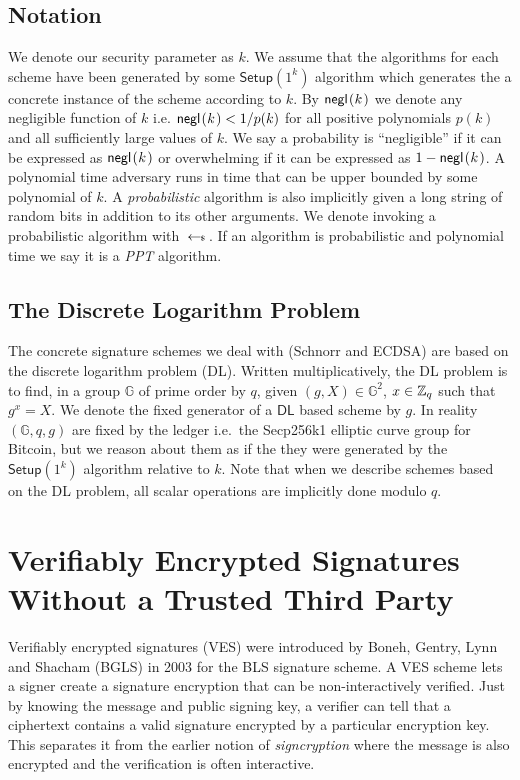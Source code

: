\documentclass[fullpage]{article}
\theoremstyle{definition}
\newcommand{\G}{\mathbb{G}}
\newcommand{\DLOG}{\textsf{DL}\xspace}
\begin{document}
\subsection{Notation}
We denote our security parameter as $k$. We assume that the algorithms for each scheme have been generated by some $\textsf{Setup}(1^k)$ algorithm which generates the a concrete instance of the scheme according to $k$. By $\negl[k]$ we denote any negligible function of $k$ i.e.  $\negl[k] < 1/p(k)$  for all positive polynomials $p(k)$ and all sufficiently large values of $k$. We say a probability is ``negligible'' if it can be expressed as $\negl[k]$ or overwhelming if it can be expressed as $1 - \negl[k]$.  A polynomial time adversary runs in time that can be upper bounded by some polynomial of $k$. A \emph{probabilistic} algorithm is also implicitly given a long string of random bits in addition to its other arguments. We denote invoking a probabilistic algorithm with $\hskip2.3pt{\gets\!\!\mbox{\tiny${\$}$\normalsize}}\,$. If an algorithm is probabilistic and polynomial time we say it is a \emph{PPT} algorithm.

\subsection{The Discrete Logarithm Problem}

The concrete signature schemes we deal with (Schnorr and ECDSA) are based on the discrete logarithm problem (\DLOG). Written multiplicatively, the \DLOG problem is to find, in a group $\G$ of prime order by $q$, given $(g,X) \in \G^2$, $x \in \mathbb{Z}_q$ such that $g^x = X$. We denote the fixed generator of a $\DLOG$ based scheme by $g$. In reality $(\G,q,g)$ are fixed by the ledger i.e.\ the Secp256k1 elliptic curve group for Bitcoin, but we reason about them as if the they were generated by the $\textsf{Setup}(1^k)$ algorithm relative to $k$. Note that when we describe schemes based on the \DLOG problem, all scalar operations are implicitly done modulo $q$.

\section{Verifiably Encrypted Signatures Without a Trusted Third Party}
\label{VES-section}

Verifiably encrypted signatures (VES) were introduced by Boneh, Gentry, Lynn and Shacham (BGLS) \cite{Boneh:2003:AVE:1766171.1766207} in 2003 for the BLS signature scheme\cite{Boneh:2001:SSW:647097.717005}. A VES scheme lets a signer create a signature encryption that can be non-interactively verified. Just by knowing the message and public signing key, a verifier can tell that a ciphertext contains a valid signature encrypted by a particular encryption key. This separates it from the earlier notion of \emph{signcryption}\cite{signcryption-book} where the message is also encrypted and the verification is often interactive.
\end{document}
